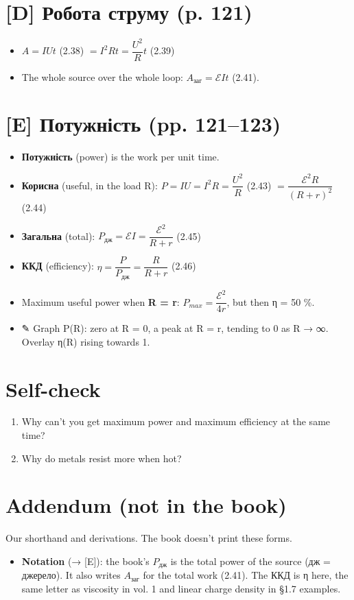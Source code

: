 \documentclass[11pt,a4paper,oneside]{book}
\newcommand{\pen}{{\sffamily\color{accent}✎}}
\begin{document}
\section*{[D] Робота струму (p. 121)}
\begin{itemize}
\item $A = IUt$ (2.38) $= I^2Rt = \dfrac{U^2}{R}t$ (2.39)
\item The whole source over the whole loop: $A_{\text{заг}} = \mathcal E It$ (2.41).
\end{itemize}

\section*{[E] Потужність (pp. 121–123)}
\begin{itemize}
\item \textbf{Потужність} (power) is the work per unit time.
\item \textbf{Корисна} (useful, in the load R): $P = IU = I^2R = \dfrac{U^2}{R}$ (2.43) $= \dfrac{\mathcal E^2R}{(R+r)^2}$ (2.44)
\item \textbf{Загальна} (total): $P_{\text{дж}} = \mathcal EI = \dfrac{\mathcal E^2}{R+r}$ (2.45)
\item \textbf{ККД} (efficiency): $\eta = \dfrac{P}{P_{\text{дж}}} = \dfrac{R}{R+r}$ (2.46)
\item Maximum useful power when \textbf{R = r}: $P_{max} = \dfrac{\mathcal E^2}{4r}$, but then η = 50 \%.
\item \pen{} Graph P(R): zero at R = 0, a peak at R = r, tending to 0 as R → ∞. Overlay η(R) rising towards 1.
\end{itemize}

\section*{Self-check}
\begin{enumerate}
\item Why can't you get maximum power and maximum efficiency at the same time?
\item Why do metals resist more when hot?
\end{enumerate}

\section*{Addendum (not in the book)}
Our shorthand and derivations. The book doesn't print these forms.
\begin{itemize}
\item \textbf{Notation} (→ [E]): the book's $P_{\text{дж}}$ is the total power of the source (дж = джерело). It also writes $A_{\text{заг}}$ for the total work (2.41). The ККД is η here, the same letter as viscosity in vol. 1 and linear charge density in §1.7 examples.
\end{itemize}
\end{document}
